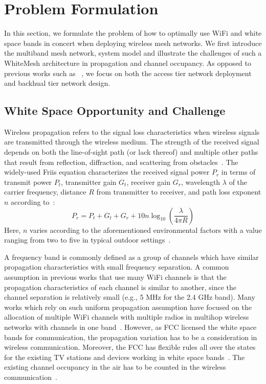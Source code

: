 \section{Problem Formulation}
\label{sec:problemformulation}

In this section, we formulate the problem of how to optimally use WiFi and white space bands 
in concert when deploying wireless mesh networks. We first introduce the multiband mesh 
network, system model and illustrate the challenges of such a WhiteMesh architecture in 
propagation and channel occupancy. As opposed to previous works such as
~\cite{tang2005interference,yuan2006cross,si2010overview}, we focus on both the access tier 
network deployment and backhual tier network design. 

\subsection{White Space Opportunity and Challenge}
\label{subsec:motivation}
Wireless propagation refers to the signal loss characteristics when wireless signals 
are transmitted through the wireless medium. The strength of the received signal 
depends on both the line-of-sight path (or lack thereof) and multiple other paths 
that result from reflection, diffraction, and scattering from obstacles~\cite{andersen1995propagation}. 
The widely-used Friis equation characterizes the received signal power $P_r$ in terms 
of transmit power $P_t$, transmitter gain $G_t$, receiver gain $G_r$, wavelength 
$\lambda$ of the carrier frequency, distance $R$ from transmitter to receiver, and 
path loss exponent $n$ according to~\cite{friis}:
\begin{equation}
\label{eq:friis}
P_r=P_t+G_t+G_r+10n \log_{10}\left( \frac{\lambda}{4\pi R}\right)
\end{equation}
Here, $n$ varies according to the aforementioned environmental factors with a value 
ranging from two to five in typical outdoor settings~\cite{rappaport}.

A frequency band is commonly defined as a group of channels which have similar propagation 
characteristics with small frequency separation. A common assumption in previous works that 
use many WiFi channels is that the propagation characteristics of each channel is similar 
to another, since the channel separation is relatively small (e.g., 5 MHz for the 2.4 GHz band).
Many works which rely on such uniform propagation assumption have focused on the allocation 
of multiple WiFi channels with multiple radios in multihop wireless networks with channels in 
one band~\cite{doraghinejad2014channel}. However, as FCC licensed the white space bands for 
communication, the propagation variation has to be a consideration in wireless communication. 
Moreover, the FCC has flexible rules all over the states for the existing TV stations 
and devices working in white space bands~\cite{googledatabase}. 
The existing channel occupancy in the air has to be counted in the wireless communication~\cite{fallah2010congestion}. 


